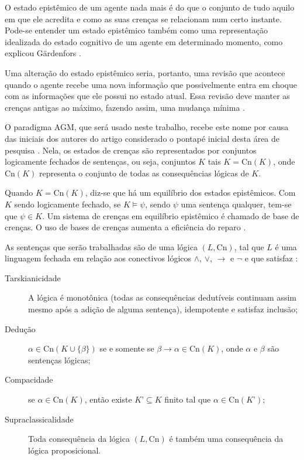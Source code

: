 O estado epistêmico de um agente nada mais é do que o conjunto de tudo aquilo em que ele acredita e como as suas crenças se relacionam num certo instante. Pode-se entender um estado epistêmico também como uma representação idealizada do estado cognitivo de um agente em determinado momento, como explicou Gärdenfors \cite{revisaoGardenfors}.

Uma alteração do estado epistêmico seria, portanto, uma revisão que acontece quando o agente recebe uma nova informação que possivelmente entra em choque com as informações que ele possui no estado atual. Essa revisão deve manter as crenças antigas ao máximo, fazendo assim, uma mudança mínima \cite{logicaResina}.

O paradigma AGM, que será usado neste trabalho, recebe este nome por causa das iniciais dos autores do artigo considerado o pontapé inicial desta área de pesquisa \cite{revisaoAGM}. Nela, os estados de crenças são representados por conjuntos logicamente fechados de sentenças, ou seja, conjuntos $ K $ tais $ K = \text{Cn}(K) $, onde $ \text{Cn}(K) $ representa o conjunto de todas as consequências lógicas de $ K $. 

Quando $ K = \text{Cn}(K) $, diz-se que há um equilíbrio dos estados epistêmicos. Com $ K $ sendo logicamente fechado, se $ K \models \psi $, sendo $ \psi $ uma sentença qualquer, tem-se que $ \psi \in K $. Um sistema de crenças em equilíbrio epistêmico é chamado de base de crenças.  O uso de bases de crenças aumenta a eficiência do reparo \cite{revisaoHansson}.

As sentenças que serão trabalhadas são de uma lógica $ (L, \text{Cn}) $, tal que $ L $ é uma linguagem fechada em relação aos conectivos lógicos $ \land $, $ \lor $, $ \to $ e $ \lnot $ e que satisfaz \cite{revisaoRibeiro}:

\begin{description}
	\item[Tarskianicidade] A lógica é monotônica (todas as consequências dedutíveis continuam assim mesmo após a adição de alguma sentença), idempotente e satisfaz inclusão;
	\item[Dedução] $ \alpha \in \text{Cn}(K \cup \{\beta\}) $ se e somente se $ \beta \to \alpha \in \text{Cn}(K) $, onde $ \alpha $ e $ \beta $ são sentenças lógicas;
	\item[Compacidade] se $ \alpha \in \text{Cn}(K) $, então existe $ K’ \subseteq K $ finito tal que $ \alpha \in \text{Cn}(K’) $;
	\item[Supraclassicalidade] Toda consequência da lógica $ (L, \text{Cn}) $ é também uma consequência da lógica proposicional.
\end{description} 

